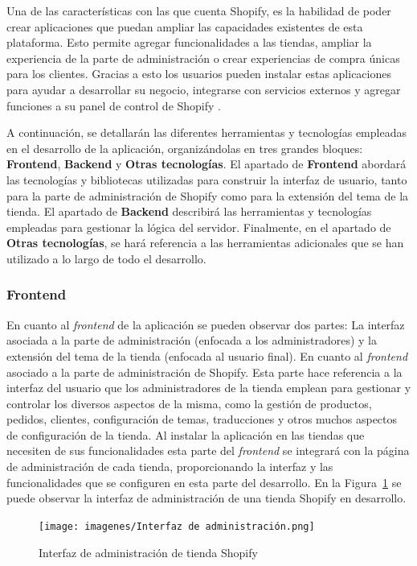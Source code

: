 \documentclass[11pt]{article}
\begin{document}
Una de las características con las que cuenta Shopify, es la habilidad de poder crear aplicaciones que puedan ampliar las capacidades existentes 
de esta plataforma. Esto permite agregar funcionalidades a las tiendas, ampliar la experiencia de la parte de administración
o crear experiencias de compra únicas para los clientes. Gracias a esto los usuarios pueden instalar estas aplicaciones para ayudar a desarrollar
su negocio, integrarse con servicios externos y agregar funciones a su panel de control de Shopify \cite{shopify-dev}.

A continuación, se detallarán las diferentes herramientas y tecnologías empleadas en el desarrollo de la aplicación, organizándolas en tres grandes
bloques: \textbf{Frontend}, \textbf{Backend} y \textbf{Otras tecnologías}. El apartado de \textbf{Frontend} abordará las tecnologías y 
bibliotecas utilizadas para construir la interfaz de usuario, tanto para la parte de administración de Shopify como para la extensión del 
tema de la tienda. El apartado de \textbf{Backend} describirá las herramientas y tecnologías empleadas para gestionar la lógica del servidor. 
Finalmente, en el apartado de \textbf{Otras tecnologías}, se hará referencia a las herramientas adicionales que se han utilizado 
a lo largo de todo el desarrollo.

\subsubsection{Frontend}
En cuanto al \textit{frontend} de la aplicación se pueden observar dos partes: La interfaz asociada a la parte de administración (enfocada a los administradores) 
y la extensión del tema de la tienda (enfocada al usuario final). 
En cuanto al \textit{frontend} asociado a la parte de administración de Shopify. 
Esta parte hace referencia a la interfaz del usuario que los administradores de la tienda emplean para gestionar y controlar los diversos aspectos de
la misma, como la gestión de productos, pedidos, clientes, configuración de temas, traducciones y otros muchos aspectos de configuración de la tienda.
Al instalar la aplicación en las tiendas que necesiten de sus funcionalidades esta parte del \textit{frontend} se integrará con la página de administración de 
cada tienda, proporcionando la interfaz y las funcionalidades que se configuren en esta parte del desarrollo. En la Figura~\ref{fig:1} se puede observar la 
interfaz de administración de una tienda Shopify en desarrollo.

\begin{figure}[H]
    \centering
    \texttt{[image: imagenes/Interfaz de administración.png]}
    \caption{\label{fig:1}Interfaz de administración de tienda Shopify}
    \vspace{\fill}
\end{figure}
\end{document}
